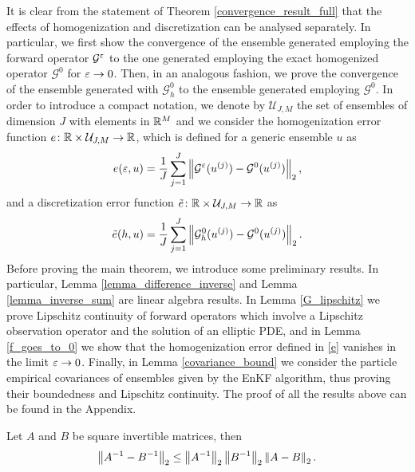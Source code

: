 \documentclass[10pt]{article}
\begin{document}
It is clear from the statement of Theorem \ref{convergence_result_full} that the effects of homogenization and discretization can be analysed separately. In particular, we first show the convergence of the ensemble generated employing the forward operator $\mathcal G^\varepsilon$ to the one generated employing the exact homogenized operator $\mathcal G^0$ for $\varepsilon \to 0$. Then, in an analogous fashion, we prove the convergence of the ensemble generated with $\mathcal G^0_h$ to the ensemble generated employing $\mathcal G^0$. In order to introduce a compact notation, we denote by $\mathcal U_{J,M}$ the set of ensembles of dimension $J$ with elements in $\mathbb{R}^M$ and we consider the homogenization error function $e \colon \mathbb{R} \times \mathcal U_{J,M} \to \mathbb{R}$, which is defined for a generic ensemble $u$ as
\begin{equation} \label{e}
	e(\varepsilon, u) = \frac{1}{J} \sum_{j=1}^J \left\|\mathcal{G}^{\varepsilon}(u^{(j)}) - \mathcal{G}^0(u^{(j)})\right\|_2,
\end{equation}
and a discretization error function $\tilde{e} \colon \mathbb{R} \times \mathcal U_{J,M} \to \mathbb{R}$ as
\begin{equation} \label{e_tilde}
	\tilde e(h, u) = \frac{1}{J} \sum_{j=1}^J \left\|\mathcal{G}^0_h(u^{(j)}) - \mathcal{G}^0(u^{(j)})\right\|_2.
\end{equation}
Before proving the main theorem, we introduce some preliminary results. In particular, Lemma \ref{lemma_difference_inverse} and Lemma \ref{lemma_inverse_sum} are linear algebra results. In Lemma \ref{G_lipschitz} we prove Lipschitz continuity of forward operators which involve a Lipschitz observation operator and the solution of an elliptic PDE, and in Lemma \ref{f_goes_to_0} we show that the homogenization error defined in \eqref{e} vanishes in the limit $\varepsilon \to 0$. Finally, in Lemma \ref{covariance_bound} we consider the particle empirical covariances of ensembles given by the EnKF algorithm, thus proving their boundedness and Lipschitz continuity. The proof of all the results above can be found in the Appendix.

\begin{lemma} \label{lemma_difference_inverse}
Let $A$ and $B$ be square invertible matrices, then
\begin{equation*}
\left\|A^{-1} - B^{-1}\right\|_2 \le \left\|A^{-1}\right\|_2 \left\|B^{-1}\right\|_2 \left\|A - B\right\|_2.
\end{equation*}
\end{lemma}
\end{document}
